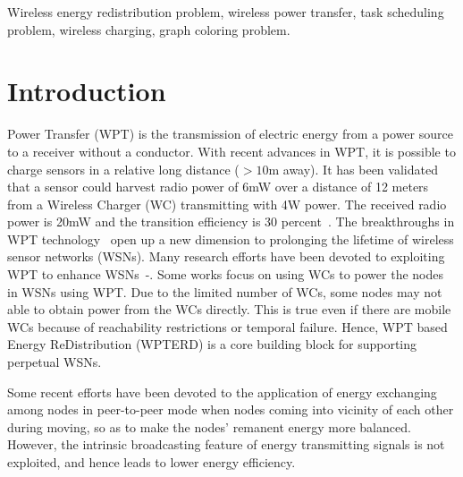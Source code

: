 \documentclass[journal,10pt]{IEEEtran}
\begin{document}
\begin{IEEEkeywords}
Wireless energy redistribution problem, wireless power transfer, task scheduling problem, wireless charging, graph coloring problem.
\end{IEEEkeywords}


\IEEEpeerreviewmaketitle



\section{Introduction}
\label{sec_intro}
\newtheorem{lemma}{\textbf{Lemma}}
\newtheorem{theorem}{\textbf{Theorem}}
\newtheorem{property}{\textbf{P}}
\newtheorem{corollary}{\textbf{Corollary}}
%
%
%
%

 Power Transfer (WPT) is the transmission of electric energy from a power source to a receiver without a conductor. With recent advances in WPT, it is possible to charge sensors in a relative long distance (${>}10$m away)\cite{Guo2017}. It has been validated that a sensor could harvest radio power of 6mW over a distance of 12 meters from a Wireless Charger (WC) transmitting with 4W power. The received radio power is 20mW and the transition efficiency is 30 percent~\cite{Nintana2012}. The breakthroughs in WPT technology~\cite{Kurs2007, Cannon2009} open up a new dimension to prolonging the lifetime of wireless sensor networks (WSNs). Many research efforts have been devoted to exploiting WPT to enhance WSNs~\cite{Xiang2013}-\cite{Madhja2017}. Some works focus on using WCs to power the nodes in WSNs using WPT. Due to the limited number of WCs, some nodes may not able to obtain power from the WCs directly. This is true even if there are mobile WCs because of reachability restrictions or temporal failure. Hence, WPT based Energy ReDistribution (WPTERD) is a core building block for supporting perpetual WSNs.

Some recent efforts have been devoted to the application of energy exchanging among nodes in peer-to-peer mode when nodes coming into vicinity of each other during moving, so as to make the nodes' remanent energy more balanced. However, the intrinsic broadcasting feature of energy transmitting signals is not exploited, and hence leads to lower energy efficiency.
\end{document}
